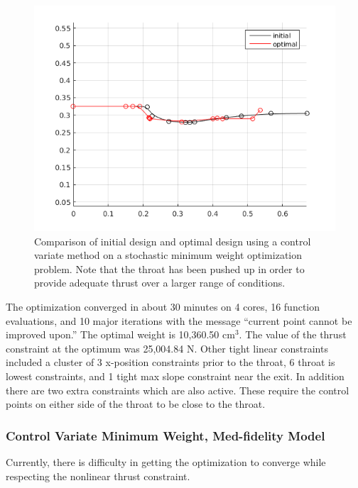 \documentclass{article}
\begin{document}
\begin{figure}
\caption{Comparison of initial design and optimal design using a control variate method on a stochastic minimum weight optimization problem. Note that the throat has been pushed up in order to provide adequate thrust over a larger range of conditions.}
\label{fig:minWeightLofiCVSimpleResults}
\begin{center}
\includegraphics[scale=0.5]{figs/cv_lowfi_result.png}
\end{center}
\end{figure}

The optimization converged in about 30 minutes on 4 cores, 16 function evaluations, and 10 major iterations with the message ``current point cannot be improved upon.'' The optimal weight is 10,360.50 $\textrm{cm}^3$. The value of the thrust constraint at the optimum was 25,004.84 N. Other tight linear constraints included a cluster of 3 x-position constraints prior to the throat, 6 throat is lowest constraints, and 1 tight max slope constraint near the exit. In addition there are two extra constraints which are also active. These require the control points on either side of the throat to be close to the throat.

\subsubsection{Control Variate Minimum Weight, Med-fidelity Model}

Currently, there is difficulty in getting the optimization to converge while respecting the nonlinear thrust constraint.
\end{document}

